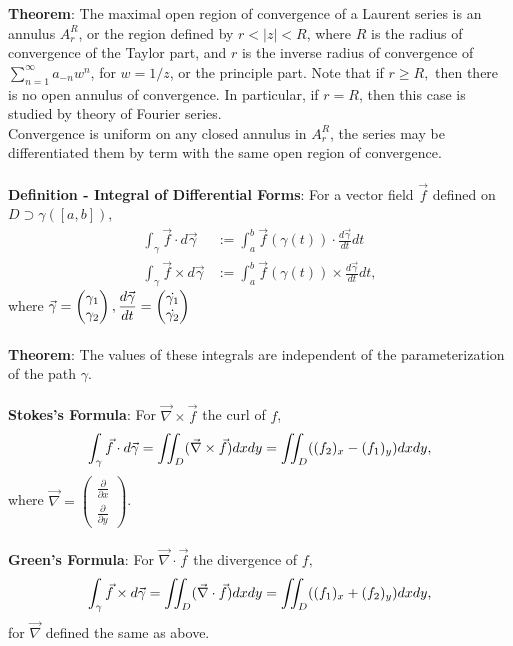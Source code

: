\documentclass{article}
\begin{document}
\textbf{Theorem}: The maximal open region of convergence of a Laurent series is an annulus $A_r^R$, or the region defined by $r < |z| < R$, where $R$ is the radius of convergence of the Taylor part, and $r$ is the inverse radius of convergence of $\sum_{n = 1}^\infty a_{-n}w^n$, for $w = 1/z$, or the principle part. Note that if $r \geq R,$ then there is no open annulus of convergence. In particular, if $r = R$, then this case is studied by theory of Fourier series. \\
Convergence is uniform on any closed annulus in $A_r^R$, the series may be differentiated them by term with the same open region of convergence. \\ \\
\textbf{Definition - Integral of Differential Forms}: For a vector field $\vec{f}$ defined on $D \supset \gamma([a, b])$, \begin{align*}
    \int_\gamma \vec{f} \cdot d\vec{\gamma} &:= \int_a^b \vec{f}(\gamma(t)) \cdot \frac{d \vec{\gamma}}{dt} dt \\
    \int_\gamma \vec{f} \times d\vec{\gamma} &:= \int_a^b \vec{f}(\gamma(t)) \times \frac{d \vec{\gamma}}{dt} dt, 
\end{align*} where $\vec{\gamma} = \begin{pmatrix}
    \gamma_1 \\ \gamma_2
\end{pmatrix}, \mathlarger{\frac{d \vec{\gamma}}{dt}} = \begin{pmatrix}
    \dot{\gamma_1} \\ \dot{\gamma_2}
\end{pmatrix}$ \\ \\
\textbf{Theorem}: The values of these integrals are independent of the parameterization of the path $\gamma$. \\ \\
\textbf{Stokes's Formula}: For $\vec{\nabla} \times \vec{f}$ the curl of $f$, $$\int_\gamma \vec{f} \cdot d\vec{\gamma} = \int \hspace{-0.5em} \int_D (\vec{\nabla} \times \vec{f})dxdy = \int \hspace{-0.5em} \int_D ((f_2)_x - (f_1)_y)dxdy,$$ where $\vec{\nabla} = \begin{pmatrix}
    \frac{\partial}{\partial x} \\ \frac{\partial}{\partial y}
\end{pmatrix}$. \\ \\
\textbf{Green's Formula}: For $\vec{\nabla} \cdot \vec{f}$ the divergence of $f,$ $$\int_\gamma \vec{f} \times d\vec{\gamma} = \int \hspace{-0.5em} \int_D (\vec{\nabla} \cdot \vec{f})dxdy = \int \hspace{-0.5em} \int_D ((f_1)_x + (f_2)_y)dxdy,$$ for $\vec{\nabla}$ defined the same as above. \\ \\
\end{document}
